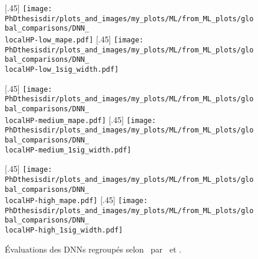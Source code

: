\begin{figure}[p]
\centering

\subcaptionbox{\label{subfig-\localHP-low_mape}}[.45\textwidth]
{\texttt{[image: \\PhDthesisdir/plots\_and\_images/my\_plots/ML/from\_ML\_plots/global\_comparisons/DNN\_\\localHP-low\_mape.pdf]}\vspace{-\baselineskip}}
\hfill
\subcaptionbox{\label{subfig-\localHP-low_1sigma}}[.45\textwidth]
{\texttt{[image: \\PhDthesisdir/plots\_and\_images/my\_plots/ML/from\_ML\_plots/global\_comparisons/DNN\_\\localHP-low\_1sig\_width.pdf]}\vspace{-\baselineskip}}

\subcaptionbox{\label{subfig-\localHP-medium_mape}}[.45\textwidth]
{\texttt{[image: \\PhDthesisdir/plots\_and\_images/my\_plots/ML/from\_ML\_plots/global\_comparisons/DNN\_\\localHP-medium\_mape.pdf]}\vspace{-\baselineskip}}
\hfill
\subcaptionbox{\label{subfig-\localHP-medium_1sigma}}[.45\textwidth]
{\texttt{[image: \\PhDthesisdir/plots\_and\_images/my\_plots/ML/from\_ML\_plots/global\_comparisons/DNN\_\\localHP-medium\_1sig\_width.pdf]}\vspace{-\baselineskip}}

\subcaptionbox{\label{subfig-\localHP-high_mape}}[.45\textwidth]
{\texttt{[image: \\PhDthesisdir/plots\_and\_images/my\_plots/ML/from\_ML\_plots/global\_comparisons/DNN\_\\localHP-high\_mape.pdf]}\vspace{-\baselineskip}}
\hfill
\subcaptionbox{\label{subfig-\localHP-high_1sigma}}[.45\textwidth]
{\texttt{[image: \\PhDthesisdir/plots\_and\_images/my\_plots/ML/from\_ML\_plots/global\_comparisons/DNN\_\\localHP-high\_1sig\_width.pdf]}\vspace{-\baselineskip}}

\caption{Évaluations des DNNs regroupés selon \localHPlong\ par \LossMAPE\ et \OneSigmaWidth.}
\label{fig-\localHP}
\end{figure}
